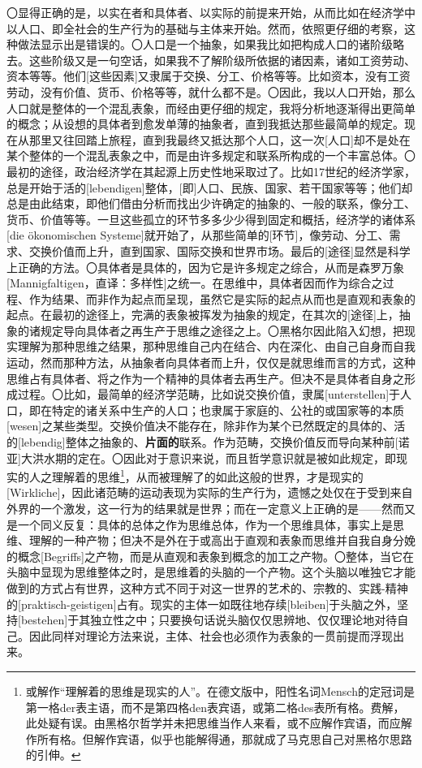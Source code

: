 \documentclass[a4paper,twoside,12pt]{ctexart}
\begin{document}
〇显得正确的是，以实在者和具体者、以实际的前提来开始，从而比如在经济学中以人口、即全社会的生产行为的基础与主体来开始。然而，依照更仔细的考察，这种做法显示出是错误的。〇人口是一个抽象，如果我比如把构成人口的诸阶级略去。这些阶级又是一句空话，如果我不了解阶级所依据的诸因素，诸如工资劳动、资本等等。他们[这些因素]又隶属于交换、分工、价格等等。比如资本，没有工资劳动，没有价值、货币、价格等等，就什么都不是。〇因此，我以人口开始，那么人口就是整体的一个混乱表象，而经由更仔细的规定，我将分析地逐渐得出更简单的概念；从设想的具体者到愈发单薄的抽象者，直到我抵达那些最简单的规定。现在从那里又往回踏上旅程，直到我最终又抵达那个人口，这一次[人口]却不是处在某个整体的一个混乱表象之中，而是由许多规定和联系所构成的一个丰富总体。〇最初的途径，政治经济学在其起源上历史性地采取过了。比如17世纪的经济学家，总是开始于活的[lebendigen]整体，[即]人口、民族、国家、若干国家等等；他们却总是由此结束，即他们借由分析而找出少许确定的抽象的、一般的联系，像分工、货币、价值等等。一旦这些孤立的环节多多少少得到固定和概括，经济学的诸体系[die ökonomischen Systeme]就开始了，从那些简单的[环节]，像劳动、分工、需求、交换价值而上升，直到国家、国际交换和世界市场。最后的[途径]显然是科学上正确的方法。〇具体者是具体的，因为它是许多规定之综合，从而是森罗万象[Mannigfaltigen，直译：多样性]之统一。在思维中，具体者因而作为综合之过程、作为结果、而非作为起点而呈现，虽然它是实际的起点从而也是直观和表象的起点。在最初的途径上，完满的表象被挥发为抽象的规定，在其次的[途径]上，抽象的诸规定导向具体者之再生产于思维之途径之上。〇黑格尔因此陷入幻想，把现实理解为那种思维之结果，那种思维自己内在结合、内在深化、由自己自身而自我运动，然而那种方法，从抽象者向具体者而上升，仅仅是就思维而言的方式，这种思维占有具体者、将之作为一个精神的具体者去再生产。但决不是具体者自身之形成过程。〇比如，最简单的经济学范畴，比如说交换价值，隶属[unterstellen]于人口，即在特定的诸关系中生产的人口；也隶属于家庭的、公社的或国家等的本质[wesen]之某些类型。交换价值决不能存在，除非作为某个已然既定的具体的、活的[lebendig]整体之抽象的、\textbf{片面的}联系。作为范畴，交换价值反而导向某种前[诺亚]大洪水期的定在。〇因此对于意识来说，而且哲学意识就是被如此规定，即现实的人之理解着的思维\footnote{或解作“理解着的思维是现实的人”。在德文版中，阳性名词Mensch的定冠词是第一格der表主语，而不是第四格den表宾语，或第二格des表所有格。费解，此处疑有误。由黑格尔哲学并未把思维当作人来看，或不应解作宾语，而应解作所有格。但解作宾语，似乎也能解得通，那就成了马克思自己对黑格尔思路的引伸。}，从而被理解了的如此这般的世界，才是现实的[Wirkliche]，因此诸范畴的运动表现为实际的生产行为，遗憾之处仅在于受到来自外界的一个激发，这一行为的结果就是世界；而在一定意义上正确的是——然而又是一个同义反复：具体的总体之作为思维总体，作为一个思维具体，事实上是思维、理解的一种产物；但决不是外在于或高出于直观和表象而思维并自我自身分娩的概念[Begriffs]之产物，而是从直观和表象到概念的加工之产物。〇整体，当它在头脑中显现为思维整体之时，是思维着的头脑的一个产物。这个头脑以唯独它才能做到的方式占有世界，这种方式不同于对这一世界的艺术的、宗教的、实践-精神的[praktisch-geistigen]占有。现实的主体一如既往地存续[bleiben]于头脑之外，坚持[bestehen]于其独立性之中；只要换句话说头脑仅仅思辨地、仅仅理论地对待自己。因此同样对理论方法来说，主体、社会也必须作为表象的一贯前提而浮现出来。
\end{document}
